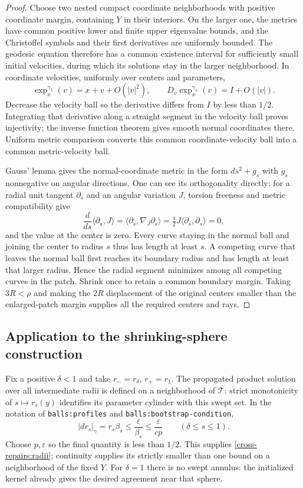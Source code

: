 \documentclass[11pt]{article}
\theoremstyle{definition}
\theoremstyle{remark}
\numberwithin{equation}{section}
\begin{document}
\begin{proof}
Choose two nested compact coordinate neighborhoods with positive
coordinate margin, containing $Y$ in their interiors. On the larger one,
the metrics have common positive lower and finite upper eigenvalue
bounds, and the Christoffel symbols and their first derivatives are
uniformly bounded. The geodesic equation therefore has a common
existence interval for sufficiently small initial velocities, during
which its solutions stay in the larger neighborhood.
In coordinate velocities, uniformly over centers and parameters,
\[
 \exp_x^{\gamma_\lambda}(v)=x+v+O(|v|^2),\qquad
 D_v\exp_x^{\gamma_\lambda}(v)=I+O(|v|).
\]
Decrease the velocity ball so the derivative differs from $I$ by less
than $1/2$. Integrating that derivative along a straight segment in the
velocity ball proves injectivity; the inverse function theorem gives
smooth normal coordinates there. Uniform metric comparison converts
this common coordinate-velocity ball into a common metric-velocity ball.

Gauss' lemma gives the normal-coordinate metric in the form
$ds^2+g_s$ with $g_s$ nonnegative on angular directions. One can see its
orthogonality directly: for a radial unit tangent $\partial_s$ and
an angular variation $J$, torsion freeness and metric compatibility give
\[
 \frac{d}{ds}\langle\partial_s,J\rangle
 =\langle\partial_s,\nabla_J\partial_s\rangle
 =\tfrac12J\langle\partial_s,\partial_s\rangle=0,
\]
and the value at the center is zero.
Every curve staying in the normal ball and joining the center to
radius $s$ thus has length at least $s$. A competing curve that leaves
the normal ball first reaches its boundary radius and has length at
least that larger radius. Hence the radial segment minimizes among
all competing curves in the patch. Shrink once to retain a common
boundary margin. Taking $3R<\rho$ and making the $2R$ displacement of
the original centers smaller than the enlarged-patch margin supplies
all the required centers and rays.
\end{proof}

\subsection{Application to the shrinking-sphere construction}

Fix a positive $\delta<1$ and take
$r_-=r_\delta$, $r_+=r_1$. The propagated product solution over all
intermediate radii is defined on a neighborhood of $\mathcal T$:
strict monotonicity of $s\mapsto r_s(y)$ identifies its parameter
cylinder with this swept set. In the notation of
\texttt{balls:profiles} and \texttt{balls:bootstrap-condition},
\[
 |dr_s|_\gamma=r_s\beta_s
 \le\frac{\varepsilon}{\beta_s}
 \le\frac{\varepsilon}{cp}\qquad(\delta\le s\le1).
\]
Choose $p,\varepsilon$ so the final quantity is less than $1/2$.
This supplies \eqref{cross-repairs:radii}; continuity supplies its
strictly smaller than one bound on a neighborhood of the fixed $Y$.
For $\delta=1$ there is no swept annulus: the initialized kernel already
gives the desired agreement near that sphere.
\end{document}
